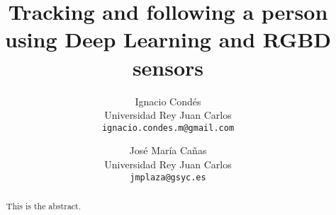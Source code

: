 \documentclass[11pt, a4paper]{article}
\title{Tracking and following a person using Deep Learning and RGBD sensors}
\author{Ignacio Condés \\
		Universidad Rey Juan Carlos \\
		\texttt{ignacio.condes.m@gmail.com} \and José María Cañas \\
		Universidad Rey Juan Carlos\\
		\texttt{jmplaza@gsyc.es}}
\begin{document}
	\maketitle
	
	\begin{abstract}
		This is the abstract.
	\end{abstract}
	
	
	
	
	
	
	
	
	
\end{document}
